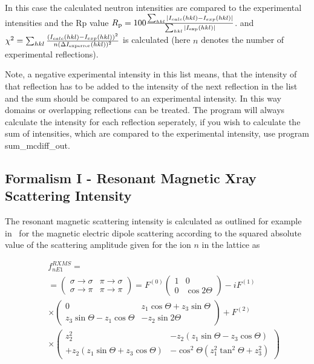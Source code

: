In this case the calculated neutron intensities are compared to
the experimental intensities and the Rp value $R_{\rm p}=100
\frac{\sum_{hkl} |I_{calc}(hkl)-I_{exp}(hkl)|}{\sum_{hkl}|I_{\rm
exp}(hkl)|}$. and $\chi^2=\sum_{hkl}\frac{ (I_{calc}(hkl)-I_{exp}(hkl))^2}{n(\Delta I_{\rm
experror}(hkl))^2}$
is calculated (here $n$ denotes the number of experimental reflections). 

Note, a negative experimental intensity in this
list means, that the intensity of that reflection has to
be added to the intensity of the next reflection in the list 
and the sum should be compared to an experimental intensity.
In this way domains or overlapping reflections can be treated. 
The program will always calculate the intensity for each reflection
seperately, if you wish to calculate the sum of intensities, which
are compared to the experimental intensity, use program {\prg sum\_mcdiff\_out}.

\subsection{Formalism I - Resonant Magnetic Xray Scattering Intensity}

The resonant magnetic scattering intensity is calculated as outlined for example in~\cite{longfield02-054417}
for the magnetic electric dipole scattering according to the squared absolute value of the scattering
amplitude given for the ion $n$ in the lattice as

\begin{eqnarray}
&&f_{nE1}^{RXMS}=   \\
&&=\left (
\begin{array}{cc}
\sigma \rightarrow \sigma & \pi \rightarrow \sigma \\
\sigma \rightarrow \pi & \pi \rightarrow \pi 
\end{array}
 \right) = F^{(0)}
\left ( \begin{array}{cc}
1 & 0 \\
0 & \cos2\Theta 
\end{array} \right )
-iF^{(1)}  \nonumber \\
&&\times 
\left ( \begin{array}{cc}
0 & z_1 \cos \Theta + z_3 \sin \Theta \\
z_3 \sin \Theta - z_1 \cos \Theta & -z_2 \sin 2\Theta  
\end{array} \right ) + F^{(2)}\nonumber \\
&&\times 
\left ( \begin{array}{cc}
z_2^2 & -z_2(z_1 \sin \Theta - z_3 \cos \Theta) \\
+z_2(z_1 \sin \Theta + z_3 \cos \Theta) & -\cos^2 \Theta (z_1^2 \tan^2 \Theta + z_3^2)
\end{array} \right ) \nonumber \\
\end{eqnarray} 

